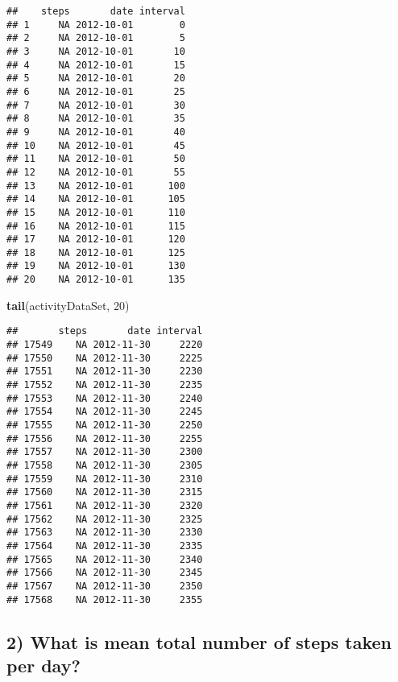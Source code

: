 \documentclass[
]{article}
\newenvironment{Shaded}{\begin{snugshade}}{\end{snugshade}}
\newcommand{\CommentTok}[1]{\textcolor[rgb]{0.56,0.35,0.01}{\textit{#1}}}
\newcommand{\DataTypeTok}[1]{\textcolor[rgb]{0.13,0.29,0.53}{#1}}
\newcommand{\DecValTok}[1]{\textcolor[rgb]{0.00,0.00,0.81}{#1}}
\newcommand{\KeywordTok}[1]{\textcolor[rgb]{0.13,0.29,0.53}{\textbf{#1}}}
\newcommand{\NormalTok}[1]{#1}
\newcommand{\OperatorTok}[1]{\textcolor[rgb]{0.81,0.36,0.00}{\textbf{#1}}}
\newcommand{\StringTok}[1]{\textcolor[rgb]{0.31,0.60,0.02}{#1}}
\begin{document}
\begin{verbatim}
##    steps       date interval
## 1     NA 2012-10-01        0
## 2     NA 2012-10-01        5
## 3     NA 2012-10-01       10
## 4     NA 2012-10-01       15
## 5     NA 2012-10-01       20
## 6     NA 2012-10-01       25
## 7     NA 2012-10-01       30
## 8     NA 2012-10-01       35
## 9     NA 2012-10-01       40
## 10    NA 2012-10-01       45
## 11    NA 2012-10-01       50
## 12    NA 2012-10-01       55
## 13    NA 2012-10-01      100
## 14    NA 2012-10-01      105
## 15    NA 2012-10-01      110
## 16    NA 2012-10-01      115
## 17    NA 2012-10-01      120
## 18    NA 2012-10-01      125
## 19    NA 2012-10-01      130
## 20    NA 2012-10-01      135
\end{verbatim}

\begin{Shaded}
\begin{Highlighting}[]
 \KeywordTok{tail}\NormalTok{(activityDataSet, }\DecValTok{20}\NormalTok{)}
\end{Highlighting}
\end{Shaded}

\begin{verbatim}
##       steps       date interval
## 17549    NA 2012-11-30     2220
## 17550    NA 2012-11-30     2225
## 17551    NA 2012-11-30     2230
## 17552    NA 2012-11-30     2235
## 17553    NA 2012-11-30     2240
## 17554    NA 2012-11-30     2245
## 17555    NA 2012-11-30     2250
## 17556    NA 2012-11-30     2255
## 17557    NA 2012-11-30     2300
## 17558    NA 2012-11-30     2305
## 17559    NA 2012-11-30     2310
## 17560    NA 2012-11-30     2315
## 17561    NA 2012-11-30     2320
## 17562    NA 2012-11-30     2325
## 17563    NA 2012-11-30     2330
## 17564    NA 2012-11-30     2335
## 17565    NA 2012-11-30     2340
## 17566    NA 2012-11-30     2345
## 17567    NA 2012-11-30     2350
## 17568    NA 2012-11-30     2355
\end{verbatim}

\hypertarget{what-is-mean-total-number-of-steps-taken-per-day}{%
\subsection{2) What is mean total number of steps taken per
day?}\label{what-is-mean-total-number-of-steps-taken-per-day}}

\begin{Shaded}
\end{Shaded}
\end{document}

